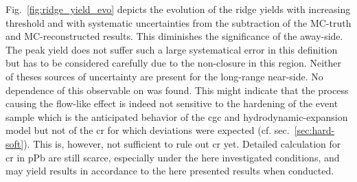 Fig.~\ref{fig:ridge_yield_evo} depicts the evolution of the ridge yields with increasing threshold and with systematic uncertainties from the subtraction of the MC-truth and MC-reconstructed results. This diminishes the significance of the away-side. The peak yield does not suffer such a large systematical error in this definition but has to be considered carefully due to the non-closure in this region. Neither of theses sources of uncertainty are present for the long-range near-side. No dependence of this observable on \ptthresh was found. This might indicate that the process causing the flow-like effect is indeed not sensitive to the hardening of the event sample which is the anticipated behavior of the  \gls{cgc} and hydrodynamic-expansion model but not of the \gls{cr} for which deviations were expected (cf. sec.~\ref{sec:hard-soft}). This is, however, not sufficient to rule out \gls{cr} yet. Detailed calculation for \gls{cr} in \gls{pPb} are still scarce, especially under the here investigated conditions, and may yield results in accordance to the here presented results when conducted.



